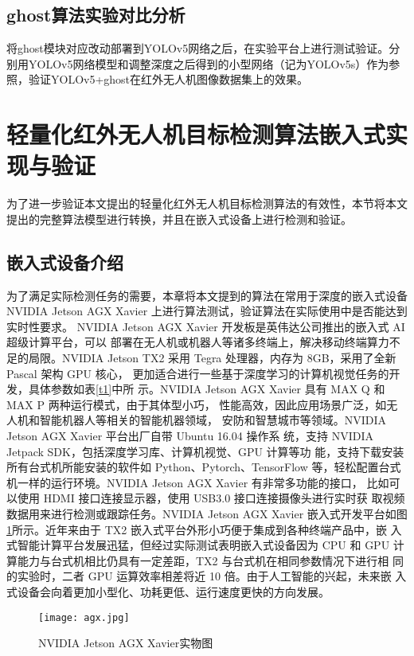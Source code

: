 \subsection{ghost算法实验对比分析}
将ghost模块对应改动部署到YOLOv5网络之后，在实验平台上进行测试验证。分别用YOLOv5网络模型和调整深度之后得到的小型网络（记为YOLOv5s）作为参照，验证YOLOv5+ghost在红外无人机图像数据集上的效果。

\section{轻量化红外无人机目标检测算法嵌入式实现与验证}
为了进一步验证本文提出的轻量化红外无人机目标检测算法的有效性，本节将本文提出的完整算法模型进行转换，并且在嵌入式设备上进行检测和验证。

\subsection{嵌入式设备介绍}
为了满足实际检测任务的需要，本章将本文提到的算法在常用于深度的嵌入式设备 NVIDIA
Jetson AGX Xavier 上进行算法测试，验证算法在实际使用中是否能达到实时性要求。
NVIDIA Jetson AGX Xavier 开发板是英伟达公司推出的嵌入式 AI 超级计算平台，可以
部署在无人机或机器人等诸多终端上，解决移动终端算力不足的局限。NVIDIA
Jetson TX2 采用 Tegra 处理器，内存为 8GB，采用了全新 Pascal 架构 GPU 核心，
更加适合进行一些基于深度学习的计算机视觉任务的开发，具体参数如表\ref{t1}中所
示。NVIDIA Jetson AGX Xavier 具有 MAX Q 和 MAX P 两种运行模式，由于其体型小巧，
性能高效，因此应用场景广泛，如无人机和智能机器人等相关的智能机器领域，
安防和智慧城市等领域。NVIDIA Jetson AGX Xavier 平台出厂自带 Ubuntu 16.04 操作系
统，支持 NVIDIA Jetpack SDK，包括深度学习库、计算机视觉、GPU 计算等功
能，支持下载安装所有台式机所能安装的软件如 Python、Pytorch、TensorFlow
等，轻松配置台式机一样的运行环境。NVIDIA Jetson AGX Xavier 有非常多功能的接口，
比如可以使用 HDMI 接口连接显示器，使用 USB3.0 接口连接摄像头进行实时获
取视频数据用来进行检测或跟踪任务。NVIDIA Jetson AGX Xavier 嵌入式开发平台如图
\ref{agx}所示。近年来由于 TX2 嵌入式平台外形小巧便于集成到各种终端产品中，嵌
入式智能计算平台发展迅猛，但经过实际测试表明嵌入式设备因为 CPU 和 GPU
计算能力与台式机相比仍具有一定差距，TX2 与台式机在相同参数情况下进行相
同的实验时，二者 GPU 运算效率相差将近 10 倍。由于人工智能的兴起，未来嵌
入式设备会向着更加小型化、功耗更低、运行速度更快的方向发展。

\begin{figure}[htbp]
    \centering
    \texttt{[image: agx.jpg]}
    \caption{NVIDIA Jetson AGX Xavier实物图}
    \label{agx}
\end{figure}

